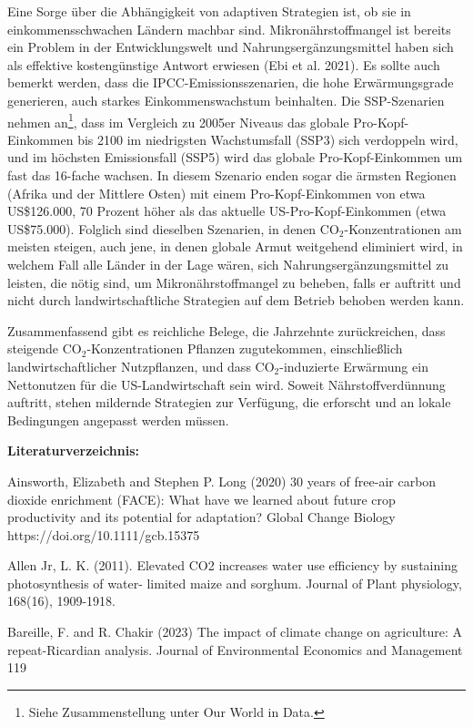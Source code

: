 \documentclass[12pt,paper=a4,DIV=12,parskip=never,chapterprefix=false,headings=standardclasses]{scrreprt}
\begin{document}
Eine Sorge über die Abhängigkeit von adaptiven Strategien ist, ob sie in einkommensschwachen Ländern machbar sind. Mikronährstoffmangel ist bereits ein Problem in der Entwicklungswelt und Nahrungsergänzungsmittel haben sich als effektive kostengünstige Antwort erwiesen (Ebi et al. 2021). Es sollte auch bemerkt werden, dass die IPCC-Emissionsszenarien, die hohe Erwärmungsgrade generieren, auch starkes Einkommenswachstum beinhalten. Die SSP-Szenarien nehmen an\footnote{Siehe Zusammenstellung unter Our World in Data.}, dass im Vergleich zu 2005er Niveaus das globale Pro-Kopf-Einkommen bis 2100 im niedrigsten Wachstumsfall (SSP3) sich verdoppeln wird, und im höchsten Emissionsfall (SSP5) wird das globale Pro-Kopf-Einkommen um fast das 16-fache wachsen. In diesem Szenario enden sogar die ärmsten Regionen (Afrika und der Mittlere Osten) mit einem Pro-Kopf-Einkommen von etwa US\$126.000, 70 Prozent höher als das aktuelle US-Pro-Kopf-Einkommen (etwa US\$75.000). Folglich sind dieselben Szenarien, in denen CO$_2$-Konzentrationen am meisten steigen, auch jene, in denen globale Armut weitgehend eliminiert wird, in welchem Fall alle Länder in der Lage wären, sich Nahrungsergänzungsmittel zu leisten, die nötig sind, um Mikronährstoffmangel zu beheben, falls er auftritt und nicht durch landwirtschaftliche Strategien auf dem Betrieb behoben werden kann.

Zusammenfassend gibt es reichliche Belege, die Jahrzehnte zurückreichen, dass steigende CO$_2$-Konzentrationen Pflanzen zugutekommen, einschließlich landwirtschaftlicher Nutzpflanzen, und dass CO$_2$-induzierte Erwärmung ein Nettonutzen für die US-Landwirtschaft sein wird. Soweit Nährstoffverdünnung auftritt, stehen mildernde Strategien zur Verfügung, die erforscht und an lokale Bedingungen angepasst werden müssen.

\vfill
\noindent\textbf{Literaturverzeichnis:}

\begingroup
\parindent=0pt
\everypar{\hangindent=2em\hangafter=1\relax}

Ainsworth, Elizabeth and Stephen P. Long (2020) 30 years of free-air carbon dioxide enrichment (FACE):
What have we learned about future crop productivity and its potential for adaptation? Global Change
Biology https://doi.org/10.1111/gcb.15375

Allen Jr, L. K. (2011). Elevated CO2 increases water use efficiency by sustaining photosynthesis of water-
limited maize and sorghum. Journal of Plant physiology, 168(16), 1909-1918.

Bareille, F. and R. Chakir (2023) The impact of climate change on agriculture: A repeat-Ricardian analysis.
Journal of Environmental Economics and Management 119
\end{document}
